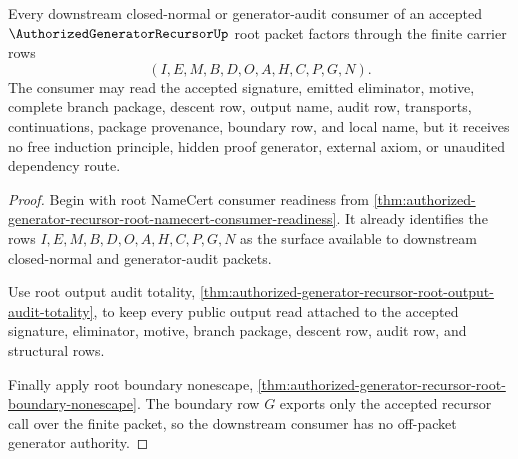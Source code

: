 \begin{theorem}
\label{thm:authorized-generator-recursor-root-consumer-factorization}
Every downstream closed-normal or generator-audit consumer of an accepted $\AuthorizedGeneratorRecursorUp$ root packet factors through the finite carrier rows
$$
(I,E,M,B,D,O,A,H,C,P,G,N).
$$
The consumer may read the accepted signature, emitted eliminator, motive, complete branch package, descent row, output name, audit row, transports, continuations, package provenance, boundary row, and local name, but it receives no free induction principle, hidden proof generator, external axiom, or unaudited dependency route.
\end{theorem}
\begin{proof}
Begin with root NameCert consumer readiness from \autoref{thm:authorized-generator-recursor-root-namecert-consumer-readiness}. It already identifies the rows $I,E,M,B,D,O,A,H,C,P,G,N$ as the surface available to downstream closed-normal and generator-audit packets.

Use root output audit totality, \autoref{thm:authorized-generator-recursor-root-output-audit-totality}, to keep every public output read attached to the accepted signature, eliminator, motive, branch package, descent row, audit row, and structural rows.

Finally apply root boundary nonescape, \autoref{thm:authorized-generator-recursor-root-boundary-nonescape}. The boundary row $G$ exports only the accepted recursor call over the finite packet, so the downstream consumer has no off-packet generator authority.
\end{proof}

